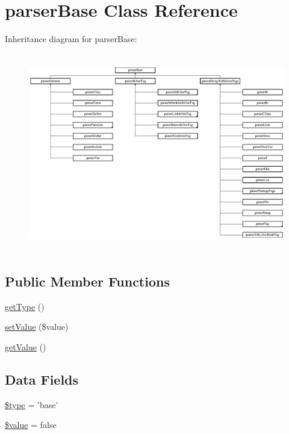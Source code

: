 \hypertarget{classparser_base}{\section{parser\-Base \-Class \-Reference}
\label{classparser_base}
}
\-Inheritance diagram for parser\-Base\-:\begin{figure}[H]
\begin{center}
\leavevmode
\includegraphics[height=8.732944cm]{classparser_base}
\end{center}
\end{figure}
\subsection*{\-Public \-Member \-Functions}
\begin{DoxyCompactItemize}
\item 
\hyperlink{classparser_base_a830b5c75df72b32396701bc563fbe3c7}{get\-Type} ()
\item 
\hyperlink{classparser_base_a7494441b6ed08a391704971873f31432}{set\-Value} (\$value)
\item 
\hyperlink{classparser_base_ac0bc18784b182c89fcfd276625aef435}{get\-Value} ()
\end{DoxyCompactItemize}
\subsection*{\-Data \-Fields}
\begin{DoxyCompactItemize}
\item 
\hyperlink{classparser_base_a9a4a6fba2208984cabb3afacadf33919}{\$type} = 'base'
\item 
\hyperlink{classparser_base_a0f298096f322952a72a50f98a74c7b60}{\$value} = false
\end{DoxyCompactItemize}


